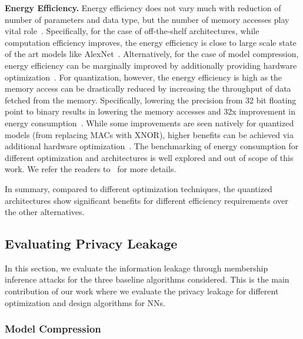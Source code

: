 \noindent\textbf{Energy Efficiency.} Energy efficiency does not vary much with reduction of number of parameters and data type, but the number of memory accesses play vital role~\cite{6757323}.
Specifically, for the case of off-the-shelf architectures, while computation efficiency improves, the energy efficiency is close to large scale state of the art models like AlexNet~\cite{DBLP:journals/corr/IandolaMAHDK16,8114708}.
Alternatively, for the case of model compression, energy efficiency can be marginally improved by additionally providing hardware optimization~\cite{journals/corr/YangCS16a,DBLP:journals/corr/HanMD15}.
For quantization, however, the energy efficiency is high as the memory access can be drastically reduced by increasing the throughput of data fetched from the memory.
Specifically, lowering the precision from 32 bit floating point to binary results in lowering the memory accesses and 32x improvement in energy consumption~\cite{NIPS2016_6573,rastegari2016xnornet}.
While some improvements are seen natively for quantized models (from replacing MACs with XNOR), higher benefits can be achieved via additional hardware optimization~\cite{Umuroglu2017FINNAF}.
The benchmarking of energy consumption for different optimization and architectures is well explored and out of scope of this work. We refer the readers to~\cite{8114708} for more details. %

In summary, compared to different optimization techniques, the quantized architectures show significant benefits for different efficiency requirements over the other alternatives.



\subsection{Evaluating Privacy Leakage}
\label{eval-leakage}

In this section, we evaluate the information leakage through membership inference attacks for the three baseline algorithms considered.
This is the main contribution of our work where we evaluate the privacy leakage for different optimization and design algorithms for NNs.

\subsubsection{Model Compression}

